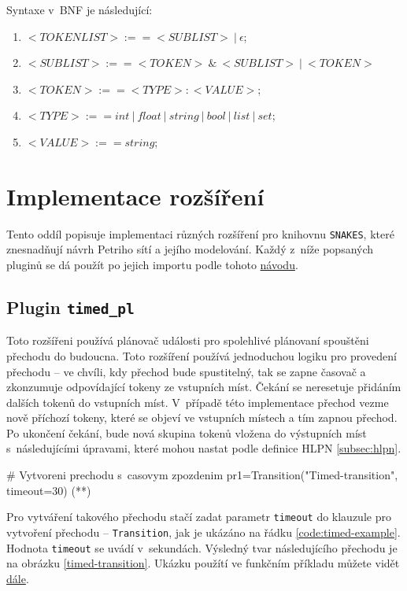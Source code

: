 Syntaxe v~BNF je následující:
\begin{enumerate}
  \item $<TOKENLIST> :== <SUBLIST> \:\vert\: \epsilon$;
  \item $<SUBLIST> :==  <TOKEN> \:\&\: <SUBLIST> \:\vert\: <TOKEN>$
  \item $<TOKEN> :== <TYPE>:<VALUE> $;
  \item $<TYPE> :== int\:\vert\:float\:\vert\:string\:\vert\:bool\:\vert\:list\:\vert\:set $;
  \item $<VALUE> :== string$;
\end{enumerate}

\section{Implementace rozšíření}
\label{sec:plug-impl}

Tento oddíl popisuje implementaci různých rozšíření pro knihovnu \texttt{SNAKES}, které znesnadňují návrh Petriho sítí a jejího modelování. Každý z~níže popsaných pluginů se dá použít po jejich importu podle tohoto \href{https://www.ibisc.univ-evry.fr/~fpommereau/SNAKES/first-steps-with-snakes.html}{návodu}.

\subsection{Plugin \texttt{timed\_pl}}
\label{subsec:timed_pl}
Toto rozšířeni používá plánovač události pro spolehlivé plánovaní spouštěni přechodu do budoucna. Toto rozšíření používá jednoduchou logiku pro provedení přechodu -- ve chvíli, kdy přechod bude spustitelný, tak se zapne časovač a zkonzumuje odpovídající tokeny ze vstupních míst. Čekání se neresetuje přidáním dalších tokenů do vstupních míst. V~případě této implementace přechod vezme nově příchozí tokeny, které se objeví ve vstupních místech a tím zapnou přechod. Po ukončení čekání, bude nová skupina tokenů vložena do výstupních míst s~následujícími úpravami, které mohou nastat podle definice HLPN \ref{subsec:hlpn}.


\begin{python}
  # Vytvoreni prechodu s~casovym zpozdenim
  pr1=Transition("Timed-transition", timeout=30) (*\label{code:timed-example}*)
\end{python}

Pro vytváření takového přechodu stačí zadat parametr \texttt{timeout} do klauzule pro vytvoření přechodu -- \texttt{Transition}, jak je ukázáno na řádku \ref{code:timed-example}. Hodnota \texttt{timeout} se uvádí v~sekundách. Výsledný tvar následujícího přechodu je na obrázku \ref{timed-transition}. Ukázku použítí ve funkčním příkladu můžete vidět \hyperref[code:timed-temp-example]{dále}.

